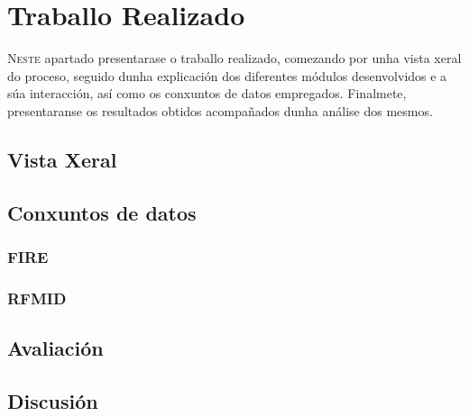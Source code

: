\chapter{Traballo Realizado}
\label{chap:Traballo Realizado}

\lettrine{N}{este} apartado presentarase o traballo realizado, comezando por unha vista xeral do proceso, 
seguido dunha explicación dos diferentes módulos desenvolvidos e a súa interacción, así como os conxuntos de datos empregados.
Finalmete, presentaranse os resultados obtidos acompañados dunha análise dos mesmos.
\section{Vista Xeral}
\label{sec:VistaXeral}


\section{Conxuntos de datos}
\label{sec:Conxuntos de datos}

\subsection{FIRE}
\label{subsec:FIRE}

\subsection{RFMID}
\label{subsec:RFMID}

\section{Avaliación}
\label{sec:Avaliación}



\section{Discusión}
\label{sec:Discusión}
